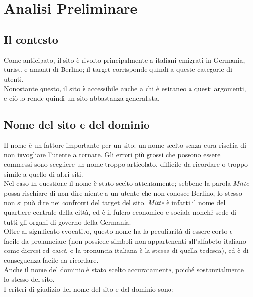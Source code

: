 \newpage
\section{Analisi Preliminare}
\subsection{Il contesto}
Come anticipato, il sito è rivolto principalmente a italiani emigrati in Germania, turisti e amanti di Berlino; il target corrisponde quindi a queste categorie di utenti. \\ 
Nonostante questo, il sito è accessibile anche a chi è estraneo a questi argomenti, e ciò lo rende quindi un sito abbastanza generalista.

\subsection{Nome del sito e del dominio}
Il nome è un fattore importante per un sito: un nome scelto senza cura rischia di non invogliare l'utente a tornare. Gli errori più grossi che possono essere commessi sono scegliere un nome troppo articolato, difficile da ricordare o troppo simile a quello di altri siti. \\
Nel caso in questione il nome è stato scelto attentamente; sebbene la parola \textit{Mitte} possa rischiare di non dire niente a un utente che non conosce Berlino, lo stesso non si può dire nei confronti del target del sito. \textit{Mitte} è infatti il nome del quartiere centrale della città, ed è il fulcro economico e sociale nonché sede di tutti gli organi di governo della Germania. \\
Oltre al significato evocativo, questo nome ha la peculiarità di essere corto e facile da pronunciare (non possiede simboli non appartenenti all'alfabeto italiano come dieresi ed \textit{eszet}, e la pronuncia italiana è la stessa di quella tedesca), ed è di conseguenza facile da ricordare. \\
Anche il nome del dominio è stato scelto accuratamente, poiché sostanzialmente lo stesso del sito. \\
I criteri di giudizio del nome del sito e del dominio sono:
